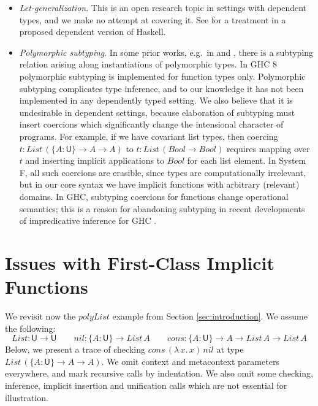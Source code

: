 \documentclass[acmsmall,review,anonymous,prologue,dvipsnames]{acmart}\settopmatter{printfolios=true,printccs=false,printacmref=false}
\renewcommand{\U}{\mathsf{U}}
\newcommand{\mi}[1]{\mathit{#1}}
\theoremstyle{remark}
\begin{document}
\begin{itemize}
  \item \emph{Let-generalization}. This is an open research topic in settings
    with dependent types, and we make no attempt at covering it. See
    \cite{eisenberg2016dependent} for a treatment in a proposed dependent
    version of Haskell.
  \item \emph{Polymorphic subtyping}. In some prior works, e.g.\ in
    \cite{dunfield2013complete} and \cite{vytiniotis2008fph}, there is a
    subtyping relation arising along instantiations of polymorphic types. In GHC
    8 polymorphic subtyping is implemented for function types only. Polymorphic
    subtyping complicates type inference, and to our knowledge it has not been
    implemented in any dependently typed setting. We also believe that it is
    undesirable in dependent settings, because elaboration of subtyping must
    insert coercions which significantly change the intensional character of
    programs. For example, if we have covariant list types, then coercing $t :
    \mi{List}\,(\{A : \U\}\to A \to A)$ to $t : \mi{List}\,(\mi{Bool} \to
    \mi{Bool})$ requires mapping over $t$ and inserting implicit applications to
    $\mi{Bool}$ for each list element. In System F, all such coercions are
    erasible, since types are computationally irrelevant, but in our core syntax
    we have implicit functions with arbitrary (relevant) domains. In GHC,
    subtyping coercions for functions change operational semantics; this is a
    reason for abandoning subtyping in recent developments of impredicative
    inference for GHC
    \cite{serrano2020a}.
\end{itemize}

\section{Issues with First-Class Implicit Functions}
\label{sec:issues}

We revisit now the $polyList$ example from Section \ref{sec:introduction}. We
assume the following:
\[
List : \U \to \U \qquad nil : \{A : \U\} \to List\,A \qquad
cons : \{A : \U\} \to A \to List\,A \to List\,A
\]
Below, we present a trace of checking $cons\,(\lambda\,x.\,x)\,nil$
at type $List\,(\{A : \U\}\to A \to A)$. We omit context and metacontext
parameters everywhere, and mark recursive calls by indentation. We also omit
some checking, inference, implicit insertion and unification calls which are not
essential for illustration.
\end{document}
